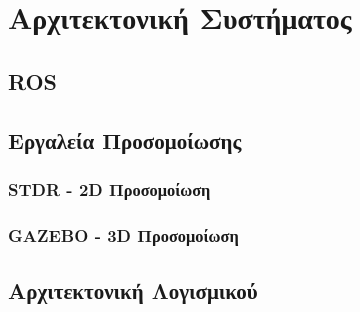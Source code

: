 
\chapter{Αρχιτεκτονική Συστήματος} %

\label{Chapter4} %


\section{ROS}


\section{Εργαλεία Προσομοίωσης}
\subsection{STDR - 2D Προσομοίωση}
\subsection{GAZEBO - 3D Προσομοίωση}


\section{Αρχιτεκτονική Λογισμικού}